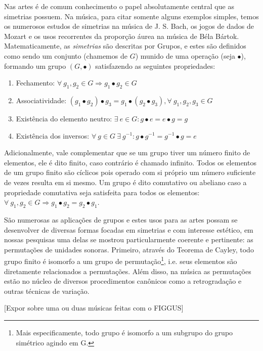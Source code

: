 Nas artes é de comum conhecimento o papel absolutamente central
que as simetrias possuem. Na música, para citar somente alguns exemplos simples,
temos os numerosos estudos de simetrias na música de J. S. Bach, os jogos
de dados de Mozart e os usos recorrentes da proporção áurea na música
de Béla Bártok. Matematicamente, as \emph{simetrias} são descritas por Grupos,
e estes são definidos como sendo um conjunto (chamemos de $G$)
munido de uma operação (seja $\bullet$), formando um grupo $(G,\bullet)$
satisfazendo as seguintes propriedades:

\begin{enumerate}
    \item Fechamento: $\forall \ g_1, g_2  \in G \Rightarrow g_1 \bullet g_2 \in G$
    \item Associatividade: $(g_1 \bullet g_2) \bullet g_3 = g_1 \bullet (g_2 \bullet g_3), \forall \ g_1, g_2, g_3 \in G$
    \item Existência do elemento neutro: $\exists \ e \in G : g \bullet e = e \bullet g = g$
    \item Existência dos inversos: $\forall \ g \in G \ \exists \ g^{-1} : g \bullet g^{-1} = g^{-1} \bullet g = e$
\end{enumerate}

Adicionalmente, vale complementar que se um grupo tiver um número
finito de elementos, ele é dito finito, caso contrário é chamado
infinito. Todos os elementos de um grupo finito são cíclicos pois
operado com si próprio um número suficiente de vezes resulta em si
mesmo. Um grupo é dito comutativo ou abeliano caso a propriedade
comutativa seja satisfeita para todos os elementos:
$\forall \ g_1, g_2 \in G \Rightarrow g_1 \bullet g_2 = g_2 \bullet g_1$.

São numerosas as aplicações de grupos e estes
usos para as artes possam se desenvolver
de diversas formas focadas em simetrias
e com interesse estético, em
nossas pesquisas uma delas se mostrou particularmente coerente
e pertinente: as permutações de unidades sonoras. Primeiro,
através do Teorema de Cayley, todo grupo finito é isomorfo
a um grupo de permutação\footnote{Mais especificamente,
todo grupo é isomorfo a um subgrupo do grupo simétrico agindo
em G.}, i.e. seus elementos são diretamente relacionados
a permutações. Além disso, na música as permutações estão
no núcleo de diversos procedimentos canônicos como a
retrogradação e outras técnicas de variação.

[Expor sobre uma ou duas músicas feitas com o FIGGUS]

